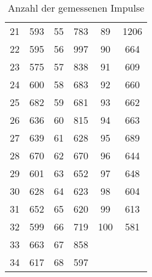 \begin{table}[!h]
\begin{tabular}{|c|c||c|c||c|c|}
		\num{21} & \num{593}& \num{55} & \num{783}&	\num{89} & \num{1206}\\
		\num{22} & \num{595}& \num{56} & \num{997}&	\num{90} & \num{664}\\ 
		\num{23} & \num{575}& \num{57} & \num{838}&	\num{91} & \num{609}\\
		\num{24} & \num{600}& \num{58} & \num{683}&	\num{92} & \num{660}\\
		\num{25} & \num{682}& \num{59} & \num{681}&	\num{93} & \num{662}\\
		\num{26} & \num{636}& \num{60} & \num{815}& \num{94} & \num{663}\\
		\num{27} & \num{639}& \num{61} & \num{628}& \num{95} & \num{689}\\
		\num{28} & \num{670}& \num{62} & \num{670}& \num{96} & \num{644}\\
		\num{29} & \num{601}& \num{63} & \num{652}& \num{97} & \num{648}\\
		\num{30} & \num{628}& \num{64} & \num{623}& \num{98} & \num{604}\\
		\num{31} & \num{652}& \num{65} & \num{620}& \num{99} & \num{613}\\
		\num{32} & \num{599}& \num{66} & \num{719}& \num{100}& \num{581}\\
		\num{33} & \num{663}& \num{67} & \num{858}&	  & \\
		\num{34} & \num{617}& \num{68} & \num{597}& & \\
		
		\hline
	\end{tabular}
	\caption{Anzahl der gemessenen Impulse \label{tab:Messwerte_III}}
\end{table}
